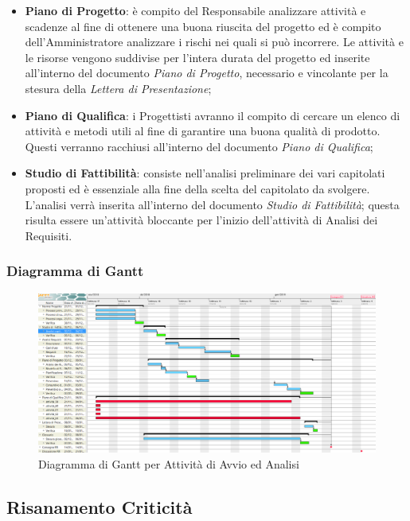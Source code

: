 \begin{itemize}
	\item \textbf{Piano di Progetto}: è compito del Responsabile analizzare attività e scadenze al fine di ottenere una buona riuscita del progetto ed è compito dell'Amministratore analizzare i rischi nei quali si può incorrere. Le attività e le risorse vengono suddivise per l'intera durata del progetto ed inserite all'interno del documento \textit{Piano di Progetto}, necessario e vincolante per la stesura della \textit{Lettera di Presentazione};
	\item \textbf{Piano di Qualifica}: i Progettisti avranno il compito di cercare un elenco di attività e metodi utili al fine di garantire una buona qualità di prodotto. Questi verranno racchiusi all'interno del documento \textit{Piano di Qualifica};
	\item \textbf{Studio di Fattibilità}: consiste nell'analisi preliminare dei vari capitolati proposti ed è essenziale alla fine della scelta del capitolato da svolgere. L'analisi verrà inserita all'interno del documento \textit{Studio di Fattibilità}; questa risulta essere un'attività bloccante per l'inizio dell'attività di Analisi dei Requisiti.  
\end{itemize}
\newpage
\begin{landscape}
\subsubsection{Diagramma di Gantt}
\begin{figure}[H]
	\centering
  		\includegraphics[width=1.0\linewidth]{./images/AvvioAnalisi.png}
  		\caption{Diagramma di Gantt per Attività di Avvio ed Analisi}
  		\label{fig:Gantt Avvio ed Analisi}
\end{figure}
\end{landscape}
\newpage


\subsection{Risanamento Criticità}
\label{RC1}

